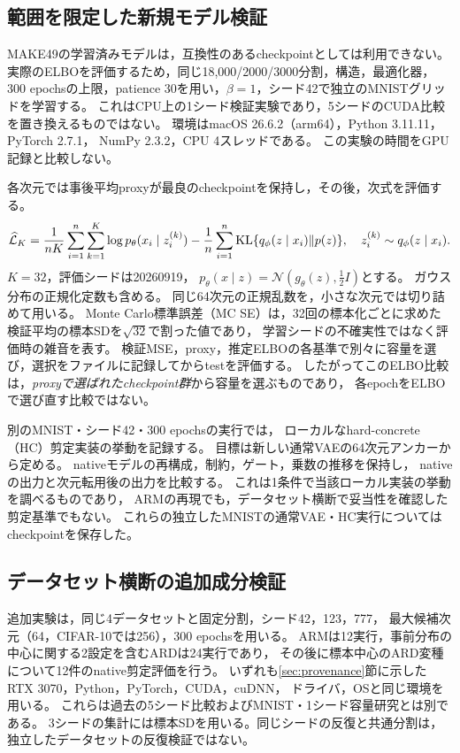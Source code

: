 \documentclass[11pt,a4paper]{ltjsarticle}
\begin{document}
\subsection{範囲を限定した新規モデル検証}\label{sec:newvalidation}
MAKE49の学習済みモデルは，互換性のあるcheckpointとしては利用できない。
実際のELBOを評価するため，同じ18,000/2000/3000分割，構造，最適化器，
300 epochsの上限，patience 30を用い，$\beta=1$，シード42で独立のMNISTグリッドを学習する。
これはCPU上の1シード検証実験であり，5シードのCUDA比較を置き換えるものではない。
環境はmacOS 26.6.2（arm64），Python 3.11.11，PyTorch 2.7.1，
NumPy 2.3.2，CPU 4スレッドである。
この実験の時間をGPU記録と比較しない。

各次元では事後平均proxyが最良のcheckpointを保持し，その後，次式を評価する。
\begin{equation}
 \widehat{\mathcal L}_K
 =\frac{1}{nK}\sum_{i=1}^n\sum_{k=1}^K
 \log p_\theta(x_i\mid z_i^{(k)})
 -\frac1n\sum_{i=1}^n
 {\rm KL}\{q_\phi(z\mid x_i)\Vert p(z)\},\quad
 z_i^{(k)}\sim q_\phi(z\mid x_i).
 \label{eq:mc}
\end{equation}
$K=32$，評価シードは20260919，
$p_\theta(x\mid z)=\mathcal N(g_\theta(z),\tfrac12 I)$とする。
ガウス分布の正規化定数も含める。
同じ64次元の正規乱数を，小さな次元では切り詰めて用いる。
Monte Carlo標準誤差（MC SE）は，32回の標本化ごとに求めた検証平均の標本SDを$\sqrt{32}$で割った値であり，
学習シードの不確実性ではなく評価時の雑音を表す。
検証MSE，proxy，推定ELBOの各基準で別々に容量を選び，選択をファイルに記録してからtestを評価する。
したがってこのELBO比較は，\emph{proxyで選ばれたcheckpoint群}から容量を選ぶものであり，
各epochをELBOで選び直す比較ではない。

別のMNIST・シード42・300 epochsの実行では，
ローカルなhard-concrete（HC）剪定実装の挙動を記録する。
目標は新しい通常VAEの64次元アンカーから定める。
nativeモデルの再構成，制約，ゲート，乗数の推移を保持し，
nativeの出力と次元転用後の出力を比較する。
これは1条件で当該ローカル実装の挙動を調べるものであり，
ARMの再現でも，データセット横断で妥当性を確認した剪定基準でもない。
これらの独立したMNISTの通常VAE・HC実行についてはcheckpointを保存した。

\subsection{データセット横断の追加成分検証}\label{sec:gpuvalidation}
追加実験は，同じ4データセットと固定分割，シード42，123，777，
最大候補次元（64，CIFAR-10では256），300 epochsを用いる。
ARMは12実行，事前分布の中心に関する2設定を含むARDは24実行であり，
その後に標本中心のARD変種について12件のnative剪定評価を行う。
いずれも\ref{sec:provenance}節に示したRTX 3070，Python，PyTorch，CUDA，cuDNN，
ドライバ，OSと同じ環境を用いる。
これらは過去の5シード比較およびMNIST・1シード容量研究とは別である。
3シードの集計には標本SDを用いる。同じシードの反復と共通分割は，独立したデータセットの反復検証ではない。
\end{document}
